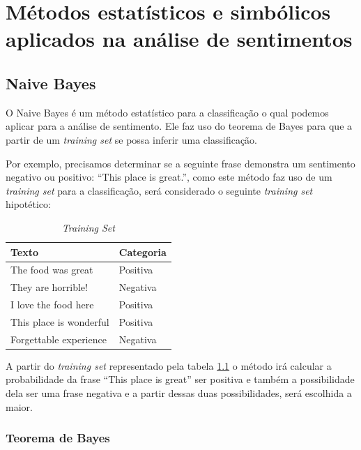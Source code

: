 \chapter{Métodos estatísticos e simbólicos aplicados na análise de sentimentos}
\label{cap:Classificadores}


\section{Naive Bayes}

O Naive Bayes é um método estatístico para a classificação o qual podemos
aplicar para a análise de sentimento. Ele faz uso do teorema de Bayes para
que a partir de um \textit{training set} se possa inferir uma classificação.

Por exemplo, precisamos determinar se a seguinte frase demonstra um sentimento
negativo ou positivo: ``This place is great.'', como este método faz uso de um
\textit{training set} para a classificação, será considerado o seguinte \textit{training set} hipotético:

\begin{table}[htb]
\centering
\begin{tabular}{|l|l|}
\hline
Texto  & Categoria \\ \hline
The food was great  & Positiva     \\ \hline
They are horrible!    & Negativa     \\ \hline
I love the food here  & Positiva     \\ \hline
This place is wonderful  & Positiva     \\ \hline
Forgettable experience  & Negativa     \\ \hline
\end{tabular}
\caption{\textit{Training Set}}
\label{tab:trainingsetnb}
\end{table}

A partir do \textit{training set} representado pela tabela
\ref{tab:trainingsetnb} o método irá calcular a probabilidade da frase ``This
place is great'' ser positiva e também a possibilidade dela ser uma frase
negativa e a partir dessas duas possibilidades, será escolhida a maior.


\subsection{Teorema de Bayes}

